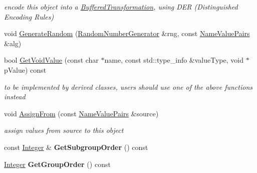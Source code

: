 \begin{DoxyCompactItemize}
\begin{DoxyCompactList}\small\item\em encode this object into a \hyperlink{class_buffered_transformation}{BufferedTransformation}, using DER (Distinguished Encoding Rules) \item\end{DoxyCompactList}\item 
void \hyperlink{class_d_l___group_parameters___integer_based_a8c9a79c493a215ca37408bb7ddfb5533}{GenerateRandom} (\hyperlink{class_random_number_generator}{RandomNumberGenerator} \&rng, const \hyperlink{class_name_value_pairs}{NameValuePairs} \&alg)
\item 
\hypertarget{class_d_l___group_parameters___integer_based_ad8a0f30e8440212bb20d3155b1d88463}{
bool \hyperlink{class_d_l___group_parameters___integer_based_ad8a0f30e8440212bb20d3155b1d88463}{GetVoidValue} (const char $\ast$name, const std::type\_\-info \&valueType, void $\ast$pValue) const }
\label{class_d_l___group_parameters___integer_based_ad8a0f30e8440212bb20d3155b1d88463}

\begin{DoxyCompactList}\small\item\em to be implemented by derived classes, users should use one of the above functions instead \item\end{DoxyCompactList}\item 
void \hyperlink{class_d_l___group_parameters___integer_based_a151a76c88372bdf98c68be2ad19400e1}{AssignFrom} (const \hyperlink{class_name_value_pairs}{NameValuePairs} \&source)
\begin{DoxyCompactList}\small\item\em assign values from source to this object \item\end{DoxyCompactList}\item 
\hypertarget{class_d_l___group_parameters___integer_based_a3448da48ade59bbf2ff4935cf1670afb}{
const \hyperlink{class_integer}{Integer} \& {\bfseries GetSubgroupOrder} () const }
\label{class_d_l___group_parameters___integer_based_a3448da48ade59bbf2ff4935cf1670afb}

\item 
\hypertarget{class_d_l___group_parameters___integer_based_a8bb45158b02cc53f55d8f9e442ff9956}{
\hyperlink{class_integer}{Integer} {\bfseries GetGroupOrder} () const }
\label{class_d_l___group_parameters___integer_based_a8bb45158b02cc53f55d8f9e442ff9956}


\end{DoxyCompactItemize}
